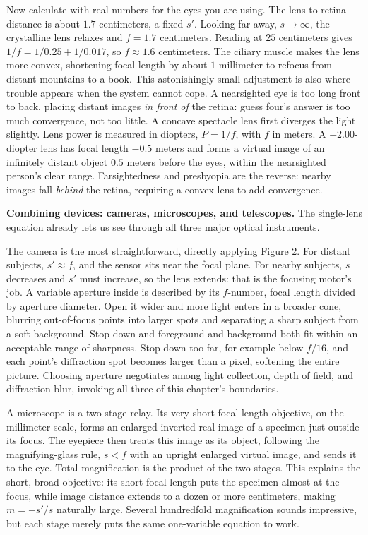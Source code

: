 \begin{mainline}
Now calculate with real numbers for the eyes you are using. The lens-to-retina distance is about $1.7$ centimeters, a fixed $s'$. Looking far away, $s\to\infty$, the crystalline lens relaxes and $f=1.7$ centimeters. Reading at $25$ centimeters gives $1/f=1/0.25+1/0.017$, so $f\approx1.6$ centimeters. The ciliary muscle makes the lens more convex, shortening focal length by about $1$ millimeter to refocus from distant mountains to a book. This astonishingly small adjustment is also where trouble appears when the system cannot cope. A nearsighted eye is too long front to back, placing distant images \emph{in front of} the retina: guess four's answer is too much convergence, not too little. A concave spectacle lens first diverges the light slightly. Lens power is measured in diopters, $P=1/f$, with $f$ in meters. A $-2.00$-diopter lens has focal length $-0.5$ meters and forms a virtual image of an infinitely distant object $0.5$ meters before the eyes, within the nearsighted person's clear range. Farsightedness and presbyopia are the reverse: nearby images fall \emph{behind} the retina, requiring a convex lens to add convergence.

\textbf{Combining devices: cameras, microscopes, and telescopes.} The single-lens equation already lets us see through all three major optical instruments.

The camera is the most straightforward, directly applying Figure 2. For distant subjects, $s'\approx f$, and the sensor sits near the focal plane. For nearby subjects, $s$ decreases and $s'$ must increase, so the lens extends: that is the focusing motor's job. A variable aperture inside is described by its $f$-number, focal length divided by aperture diameter. Open it wider and more light enters in a broader cone, blurring out-of-focus points into larger spots and separating a sharp subject from a soft background. Stop down and foreground and background both fit within an acceptable range of sharpness. Stop down too far, for example below $f/16$, and each point's diffraction spot becomes larger than a pixel, softening the entire picture. Choosing aperture negotiates among light collection, depth of field, and diffraction blur, invoking all three of this chapter's boundaries.

A microscope is a two-stage relay. Its very short-focal-length objective, on the millimeter scale, forms an enlarged inverted real image of a specimen just outside its focus. The eyepiece then treats this image as its object, following the magnifying-glass rule, $s<f$ with an upright enlarged virtual image, and sends it to the eye. Total magnification is the product of the two stages. This explains the short, broad objective: its short focal length puts the specimen almost at the focus, while image distance extends to a dozen or more centimeters, making $m=-s'/s$ naturally large. Several hundredfold magnification sounds impressive, but each stage merely puts the same one-variable equation to work.


\end{mainline}
